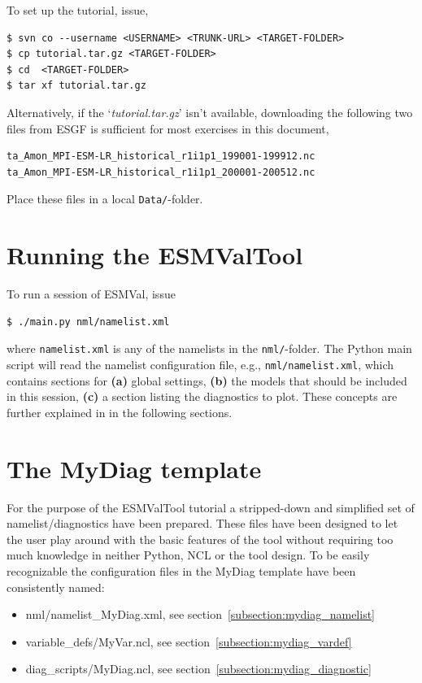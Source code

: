 \documentclass[12pt]{article}
\newcommand{\docref}[1]{`\emph{#1}'}
\begin{document}
To set up the tutorial, issue, 
\begin{Verbatim}[frame=single, fontsize=\footnotesize]
$ svn co --username <USERNAME> <TRUNK-URL> <TARGET-FOLDER>
$ cp tutorial.tar.gz <TARGET-FOLDER>
$ cd  <TARGET-FOLDER>
$ tar xf tutorial.tar.gz
\end{Verbatim}
Alternatively, if the \docref{tutorial.tar.gz} isn't available,
downloading the following two files from ESGF\cite{esgf} is sufficient
for most exercises in this document,

\begin{Verbatim}[frame=single, fontsize=\footnotesize]
ta_Amon_MPI-ESM-LR_historical_r1i1p1_199001-199912.nc
ta_Amon_MPI-ESM-LR_historical_r1i1p1_200001-200512.nc
\end{Verbatim}
Place these files in a local \texttt{Data/}-folder.



% 
% 
\section{Running the ESMValTool}\label{section:running_esmvaltool}
To run a session of ESMVal, issue 
\begin{Verbatim}[frame=single, fontsize=\footnotesize]
$ ./main.py nml/namelist.xml
\end{Verbatim}
where \texttt{namelist.xml} is any of the namelists in the
\texttt{nml/}-folder. The Python main script will read the namelist
configuration file, e.g., \texttt{nml/namelist.xml}, which contains
sections for \textbf{(a)} global settings, \textbf{(b)} the models
that should be included in this session, \textbf{(c)} a section
listing the diagnostics to plot. These concepts are further explained
in in the following sections.



% 
% 
\section{The MyDiag template}\label{section:mydiag}
For the purpose of the ESMValTool tutorial a stripped-down and
simplified set of namelist/diagnostics have been prepared. These files
have been designed to let the user play around with the basic features
of the tool without requiring too much knowledge in neither Python,
NCL or the tool design. To be easily recognizable the configuration
files in the MyDiag template have been consistently named: 
\begin{itemize}
\item nml/namelist\_MyDiag.xml, see section~\ref{subsection:mydiag_namelist}
\item variable\_defs/MyVar.ncl, see section~\ref{subsection:mydiag_vardef}
\item diag\_scripts/MyDiag.ncl, see section~\ref{subsection:mydiag_diagnostic}
\end{itemize}
\end{document}
